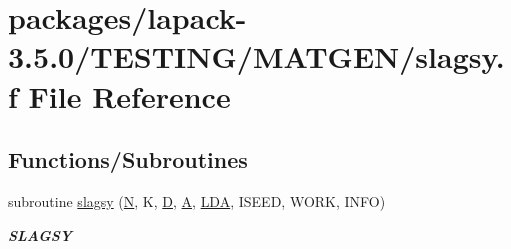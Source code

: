 \hypertarget{slagsy_8f}{}\section{packages/lapack-\/3.5.0/\+T\+E\+S\+T\+I\+N\+G/\+M\+A\+T\+G\+E\+N/slagsy.f File Reference}
\label{slagsy_8f}
\subsection*{Functions/\+Subroutines}
\begin{DoxyCompactItemize}
\item 
subroutine \hyperlink{group__real__matgen_ga5a9f8dec609201d836f0d7be30819977}{slagsy} (\hyperlink{polmisc_8c_a0240ac851181b84ac374872dc5434ee4}{N}, K, \hyperlink{odrpack_8h_a7dae6ea403d00f3687f24a874e67d139}{D}, \hyperlink{classA}{A}, \hyperlink{example__user_8c_ae946da542ce0db94dced19b2ecefd1aa}{L\+D\+A}, I\+S\+E\+E\+D, W\+O\+R\+K, I\+N\+F\+O)
\begin{DoxyCompactList}\small\item\em {\bfseries S\+L\+A\+G\+S\+Y} \end{DoxyCompactList}\end{DoxyCompactItemize}
